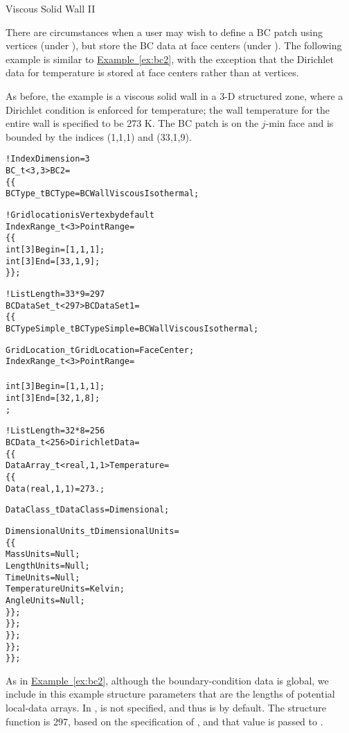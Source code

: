 \newpage
\begin{example}{Viscous Solid Wall II}
\label{ex:bc6}

There are circumstances when a user may wish to define a BC patch using
vertices (under ), but store the BC data at face centers
(under ).
The following example is similar to \hyperref[ex:bc2]{Example~\ref*{ex:bc2}},
with the exception that the Dirichlet data for temperature is stored at
face centers rather than at vertices.

As before, the example is a viscous solid wall in a 3-D structured
zone, where a Dirichlet condition is enforced for temperature; the wall
temperature for the entire wall is specified to be 273 K.
The BC patch is on the $j$-min face and is bounded by the indices
(1,1,1) and (33,1,9).
\begin{alltt}
  !  IndexDimension = 3
  BC\_t<3,3> BC2 =
    \{\{
    BCType\_t BCType = BCWallViscousIsothermal ;

    !  Grid location is Vertex by default
    IndexRange\_t<3> PointRange =
      \{\{
      int[3] Begin = [1 ,1,1] ;
      int[3] End   = [33,1,9] ;
      \}\} ;

    !  ListLength = 33*9 = 297
    BCDataSet\_t<297> BCDataSet1 =
      \{\{
      BCTypeSimple\_t BCTypeSimple = BCWallViscousIsothermal ;

      GridLocation\_t GridLocation = FaceCenter ;
      IndexRange\_t<3> PointRange =
        {{
        int[3] Begin = [1 ,1,1] ;
        int[3] End   = [32,1,8] ;
        }} ;

      !  ListLength = 32*8 = 256
      BCData\_t<256> DirichletData =
        \{\{
        DataArray\_t<real, 1, 1> Temperature =
          \{\{
          Data(real, 1, 1) = 273. ;
          
          DataClass\_t DataClass = Dimensional ;

          DimensionalUnits\_t DimensionalUnits = 
            \{\{
            MassUnits        = Null ;
            LengthUnits      = Null ;
            TimeUnits        = Null ;
            TemperatureUnits = Kelvin ;
            AngleUnits       = Null ;
            \}\} ;
          \}\} ;
        \}\} ;
      \}\} ;
    \}\} ;
\end{alltt}

As in \hyperref[ex:bc2]{Example~\ref*{ex:bc2}},
although the boundary-condition data is global, we include in this
example structure parameters that are the lengths of potential
local-data arrays.
In ,  is not specified, and thus is
 by default.
The structure function  is 297, based on the
specification of , and that value is passed to
.


\end{example}
